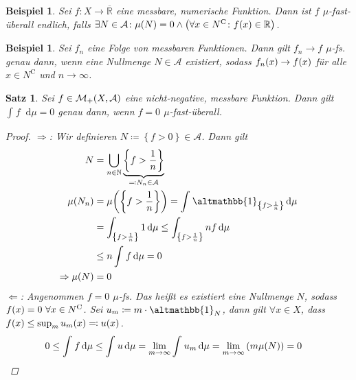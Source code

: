 \documentclass[11pt, twoside, a4paper]{article}
\theoremstyle{plain}
\newtheorem{satz}[blockelement]{Satz}
\newtheorem{beispiel}[blockelement]{Beispiel}
\numberwithin{equation}{subsection}
\newcommand{\set}[1]{\left\{#1\right\}}
\newcommand{\pair}[1]{\left(#1\right)}
\newcommand{\of}[1]{\mathopen{}\mathclose{}\bgroup\left(#1\aftergroup\egroup\right)}
\newcommand{\impl}[0]{\Rightarrow{}}
\newcommand{\dif}{\mathop{}\!\mathrm{d}}
\newcommand{\charfunc}{\altmathbb{1}}
\newcommand{\toinf}{\to\infty}
\newcommand{\comp}[1]{{#1}^{\mathrm{C}}}
\newcommand{\anf}[1]{\glqq{}#1\grqq}
\newcommand{\R}{\mathbb{R}}
\newcommand{\N}{\mathbb{N}}
\newcommand{\mA}{\mathcal{A}}
\newcommand{\mM}{\mathcal{M}}
\begin{document}
    \begin{beispiel}
        Sei $f: X \to \overline{\R}$ eine messbare, numerische Funktion. Dann ist $f$ $\mu$-fast-überall endlich, falls $\exists N\in\mA\colon \mu\of{N} = 0 \land \pair{\forall x\in\comp{N}\colon f\of{x}\in\R}$.
    \end{beispiel}

    \begin{beispiel}
        Sei $f_n$ eine Folge von messbaren Funktionen. Dann gilt $f_n \to f$ $\mu$-fs. genau dann, wenn eine Nullmenge $N\in\mA$ existiert, sodass $f_n\of{x} \to f\of{x}$ für alle $x\in\comp{N}$ und $n\toinf$.
    \end{beispiel}

    \begin{satz} %
        \label{satz:nullmenge-integral-null}
        Sei $f \in \mM_+\of{X, \mA}$ eine nicht-negative, messbare Funktion. Dann gilt $ \int_{}^{} f \dif \mu = 0$ genau dann, wenn $f=0$ $\mu$-fast-überall.

        \begin{proof}
            \anf{$\impl$}: Wir definieren $N\coloneqq \set{f > 0} \in\mA$. Dann gilt
            \begin{align*}
                N &= \bigcup_{n\in\N} \underbrace{\set{f > \frac{1}{n}}}_{\eqqcolon N_n \in \mA}\\
                \mu\of{N_n} &= \mu\of{\set{f > \frac{1}{n}}} = \int_{}^{} \charfunc_{\set{f > \frac{1}{n}}} \dif \mu\\
                &= \int_{\set{f > \frac{1}{n}}}^{} 1 \dif \mu \leq \int_{\set{f > \frac{1}{n}}}^{} nf \dif \mu\\
                &\leq n \int_{}^{} f \dif \mu = 0\\
                \impl \mu\of{N} &= 0
            \end{align*}
            \anf{$\Leftarrow$}: Angenommen $f = 0$ $\mu$-fs. Das heißt es existiert eine Nullmenge $N$, sodass $f\of{x} = 0~\forall x\in\comp{N}$. Sei $u_m \coloneqq m \cdot \charfunc_{N}$, dann gilt $\forall x\in X$, dass $f\of{x} \leq \sup_{m} u_m\of{x} \eqqcolon u\of{x}$.
            \begin{align*}
                0\leq \int_{}^{} f \dif \mu &\leq \int_{}^{} u \dif \mu = \lim_{m\toinf} \int_{}^{} u_m \dif \mu = \lim_{m\toinf} \pair{m \mu\of{N}} = 0\qedhere
            \end{align*}
        \end{proof}
    \end{satz}
\end{document}
